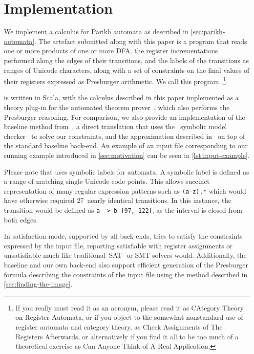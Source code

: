 \documentclass[acmsmall,review,anonymous,screen]{acmart}\settopmatter{printfolios=true,printccs=false,printacmref=true}
\theoremstyle{definition}
\begin{document}
\section{Implementation}\label{sec:implementation}

We implement a calculus for Parikh automata as described in
\cref{sec:parikh-automata}. The artefact submitted along with this paper
is a program that reads one or more products of one or more DFA, the register
incrementations performed along the edges of their transitions, and the labels
of the transitions as ranges of Unicode characters, along with a set of
constraints on the final values of their registers expressed as Presburger
arithmetic. We call this program \Catra.\footnote{If you really must read it
as an acronym, please read it as CAtegory Theory on Register Automata, or if you
object to the somewhat nonstandard use of register automata and category theory,
as Check Assignments of The Registers Afterwards, or alternatively if you find it
all to be too much of a theoretical exercise as Can Anyone Think of A Real
Application.}

\Catra{} is written in Scala, with the calculus described in this paper
implemented as a theory plug-in for the \Princess{} automated theorem
prover~\cite{princess}, which also performs the Presburger reasoning. For
comparison, we also provide an implementation of the baseline method
from~\cite{generate-parikh-image}, a direct translation that uses the~\Nuxmv{}
symbolic model checker~\cite{nuxmv} to solve our constraints, and the
approximation described in~\cite{approximate-parikh} on top of the standard
baseline back-end. An example of an input file corresponding to our running
example introduced in \cref{sec:motivation} can be seen in
\cref{lst:input-example}.

Please note that \Catra{} uses symbolic labels for automata. A symbolic label is
defined as a range of matching single Unicode code points. This allows succinct
representation of many regular expression patterns such as \lstinline{(a-z).*}
which would have otherwise required $27$~nearly identical transitions. In this
instance, the transition would be defined as \lstinline{a -> b [97, 122]}, as the
interval is closed from both edges.

In satisfaction mode, supported by all back-ends, \Catra{} tries to satisfy the
constraints expressed by the input file, reporting satisfiable with register
assignments or unsatisfiable much like traditional~SAT- or SMT solvers would.
Additionally, the baseline and our own back-end also support efficient
generation of the Presburger formula describing the constraints of the input
file using the method described in \cref{sec:finding-the-image}.
\end{document}
